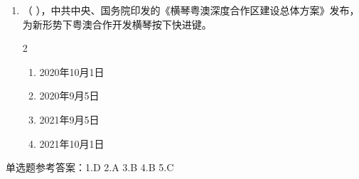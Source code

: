 \documentclass[a4paper,11pt]{ctexart}
\begin{document}
\begin{enumerate}
    \item （ ），中共中央、国务院印发的《横琴粤澳深度合作区建设总体方案》发布，为新形势下粤澳合作开发横琴按下快进键。
    \begin{multicols}{2}
    \begin{enumerate}
        \item 2020年10月1日
        \item 2020年9月5日
        \item 2021年9月5日
        \item 2021年10月1日
    \end{enumerate}
    \end{multicols}
\end{enumerate}

\begin{answerbox}
单选题参考答案：1.D \quad 2.A \quad 3.B \quad 4.B \quad 5.C
\end{answerbox}
\end{document}
